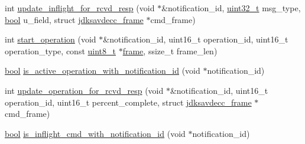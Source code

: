 \begin{DoxyCompactItemize}
\item 
int \hyperlink{classavdecc__lib_1_1aecp__controller__state__machine_a997abd9786c330a5505e903e6443208e}{update\+\_\+inflight\+\_\+for\+\_\+rcvd\+\_\+resp} (void $\ast$\&notification\+\_\+id, \hyperlink{parse_8c_a6eb1e68cc391dd753bc8ce896dbb8315}{uint32\+\_\+t} msg\+\_\+type, \hyperlink{avb__gptp_8h_af6a258d8f3ee5206d682d799316314b1}{bool} u\+\_\+field, struct \hyperlink{structjdksavdecc__frame}{jdksavdecc\+\_\+frame} $\ast$cmd\+\_\+frame)
\item 
int \hyperlink{classavdecc__lib_1_1aecp__controller__state__machine_abedf9eeaef42d341bb70205424c87266}{start\+\_\+operation} (void $\ast$\&notification\+\_\+id, uint16\+\_\+t operation\+\_\+id, uint16\+\_\+t operation\+\_\+type, const \hyperlink{stdint_8h_aba7bc1797add20fe3efdf37ced1182c5}{uint8\+\_\+t} $\ast$\hyperlink{gst__avb__playbin_8c_ac8e710e0b5e994c0545d75d69868c6f0}{frame}, ssize\+\_\+t frame\+\_\+len)
\item 
\hyperlink{avb__gptp_8h_af6a258d8f3ee5206d682d799316314b1}{bool} \hyperlink{classavdecc__lib_1_1aecp__controller__state__machine_a478e43b65aafe1a0e927e84304047003}{is\+\_\+active\+\_\+operation\+\_\+with\+\_\+notification\+\_\+id} (void $\ast$notification\+\_\+id)
\item 
int \hyperlink{classavdecc__lib_1_1aecp__controller__state__machine_a862f2ed40a94cb35626166286b0fa151}{update\+\_\+operation\+\_\+for\+\_\+rcvd\+\_\+resp} (void $\ast$\&notification\+\_\+id, uint16\+\_\+t operation\+\_\+id, uint16\+\_\+t percent\+\_\+complete, struct \hyperlink{structjdksavdecc__frame}{jdksavdecc\+\_\+frame} $\ast$cmd\+\_\+frame)
\item 
\hyperlink{avb__gptp_8h_af6a258d8f3ee5206d682d799316314b1}{bool} \hyperlink{classavdecc__lib_1_1aecp__controller__state__machine_aa5c3cd6eac3ef43eb32c176106a182e6}{is\+\_\+inflight\+\_\+cmd\+\_\+with\+\_\+notification\+\_\+id} (void $\ast$notification\+\_\+id)
\end{DoxyCompactItemize}
